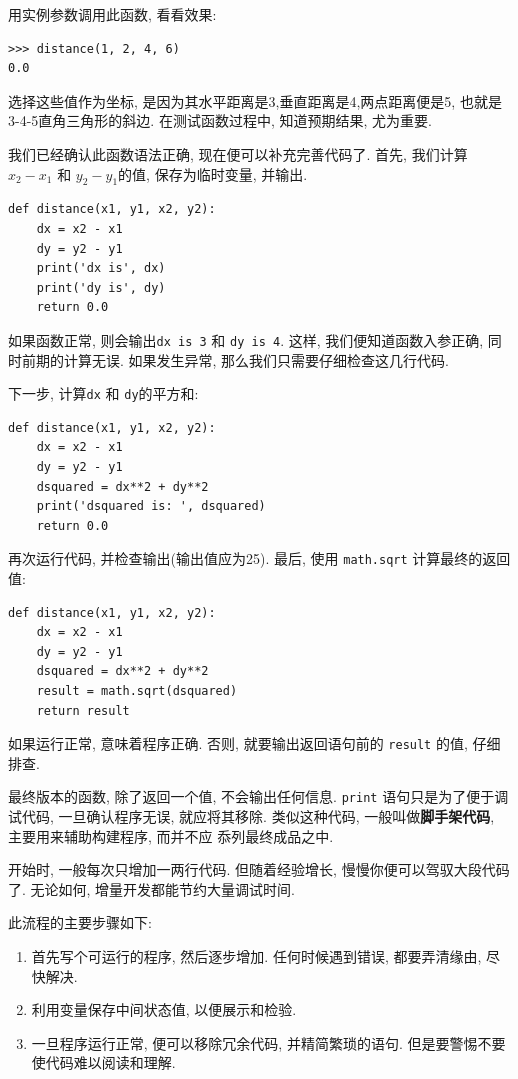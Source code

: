 \documentclass[10pt]{book}
\begin{document}
用实例参数调用此函数, 看看效果:

\begin{verbatim}
>>> distance(1, 2, 4, 6)
0.0
\end{verbatim}
%
选择这些值作为坐标, 是因为其水平距离是3,垂直距离是4,两点距离便是5, 
也就是3-4-5直角三角形的斜边. 
在测试函数过程中, 知道预期结果, 尤为重要. 

我们已经确认此函数语法正确, 现在便可以补充完善代码了. 
首先, 我们计算$x_2 - x_1$ 和 $y_2 - y_1$的值, 保存为临时变量, 并输出. 

\begin{verbatim}
def distance(x1, y1, x2, y2):
    dx = x2 - x1
    dy = y2 - y1
    print('dx is', dx)
    print('dy is', dy)
    return 0.0
\end{verbatim}
%
如果函数正常, 则会输出\verb"dx is 3" 和 \verb"dy is 4". 
这样, 我们便知道函数入参正确, 同时前期的计算无误. 
如果发生异常, 那么我们只需要仔细检查这几行代码. 

下一步, 计算{\tt dx} 和 {\tt dy}的平方和:

\begin{verbatim}
def distance(x1, y1, x2, y2):
    dx = x2 - x1
    dy = y2 - y1
    dsquared = dx**2 + dy**2
    print('dsquared is: ', dsquared)
    return 0.0
\end{verbatim}
%
再次运行代码, 并检查输出(输出值应为25). 
最后, 使用 {\tt math.sqrt} 计算最终的返回值:

\begin{verbatim}
def distance(x1, y1, x2, y2):
    dx = x2 - x1
    dy = y2 - y1
    dsquared = dx**2 + dy**2
    result = math.sqrt(dsquared)
    return result
\end{verbatim}
%
如果运行正常, 意味着程序正确. 
否则, 就要输出返回语句前的 {\tt result} 的值, 仔细排查. 

最终版本的函数, 除了返回一个值, 不会输出任何信息. 
{\tt print} 语句只是为了便于调试代码, 一旦确认程序无误, 就应将其移除. 
类似这种代码, 一般叫做{\bf 脚手架代码},  主要用来辅助构建程序, 而并不应
忝列最终成品之中. 

开始时, 一般每次只增加一两行代码. 但随着经验增长, 慢慢你便可以驾驭大段代码了. 
无论如何, 增量开发都能节约大量调试时间.

此流程的主要步骤如下:

\begin{enumerate}

\item 首先写个可运行的程序, 然后逐步增加. 任何时候遇到错误, 都要弄清缘由, 尽快解决. 

\item 利用变量保存中间状态值, 以便展示和检验. 

\item 一旦程序运行正常, 便可以移除冗余代码, 并精简繁琐的语句. 
但是要警惕不要使代码难以阅读和理解. 

\end{enumerate}
\end{document}
